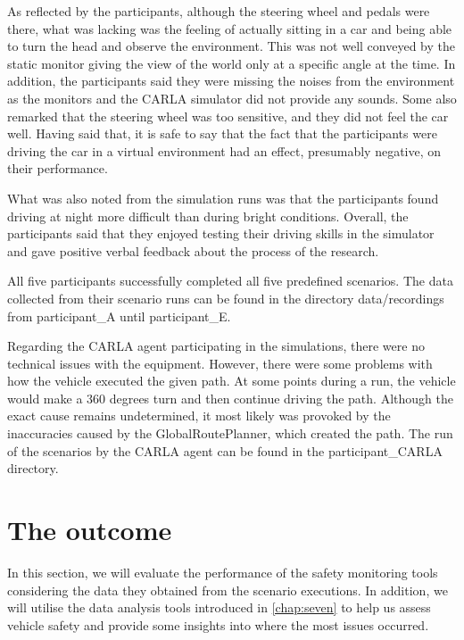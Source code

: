 As reflected by the participants, although the steering wheel and pedals were there, what was lacking was the feeling of actually sitting in a car and being able to turn the head and observe the environment. This was not well conveyed by the static monitor giving the view of the world only at a specific angle at the time. In addition, the participants said they were missing the noises from the environment as the monitors and the CARLA simulator did not provide any sounds. Some also remarked that the steering wheel was too sensitive, and they did not feel the car well. Having said that, it is safe to say that the fact that the participants were driving the car in a virtual environment had an effect, presumably negative, on their performance.

What was also noted from the simulation runs was that the participants found driving at night more difficult than during bright conditions. Overall, the participants said that they enjoyed testing their driving skills in the simulator and gave positive verbal feedback about the process of the research.

All five participants successfully completed all five predefined scenarios. The data collected from their scenario runs can be found in the directory data/recordings from participant\_A until participant\_E.

Regarding the CARLA agent participating in the simulations, there were no technical issues with the equipment. However, there were some problems with how the vehicle executed the given path. At some points during a run, the vehicle would make a 360 degrees turn and then continue driving the path. Although the exact cause remains undetermined, it most likely was provoked by the inaccuracies caused by the GlobalRoutePlanner, which created the path. The run of the scenarios by the CARLA agent can be found in the participant\_CARLA directory.


\section{The outcome} \label{sect-9.3}

In this section, we will evaluate the performance of the safety monitoring tools considering the data they obtained from the scenario executions. In addition, we will utilise the data analysis tools introduced in \autoref{chap:seven} to help us assess vehicle safety and provide some insights into where the most issues occurred.

